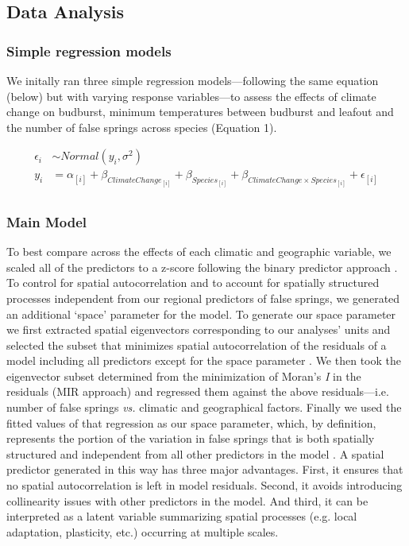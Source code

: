 \documentclass{article}\usepackage[]{graphicx}\usepackage[]{color}
\begin{document}
\subsection*{Data Analysis} 
\subsubsection*{Simple regression models}
We initally ran three simple regression models---following the same equation (below) but with varying response variables---to assess the effects of climate change on budburst, minimum temperatures between budburst and leafout and the number of false springs across species (Equation 1).

\begin{align*}
\epsilon_i & \sim Normal(y_i ,  \sigma^{2}) \tag{1}\\
y_i &= \alpha_{[i]} + \beta_{ClimateChange_{[i]}} + \beta_{Species_{[i]}} + \beta_{ClimateChange \times Species_{[i]}} + \epsilon_{[i]} \nonumber\\
\end{align*}

\subsubsection*{Main Model}
To best compare across the effects of each climatic and geographic variable, we scaled all of the predictors to a z-score following the binary predictor approach \citep{Gelman2006}. To control for spatial autocorrelation and to account for spatially structured processes independent from our regional predictors of false springs, we generated an additional `space' parameter for the model. To generate our space parameter we first extracted spatial eigenvectors corresponding to our analyses' units and selected the subset that minimizes spatial autocorrelation of the residuals of a model including all predictors except for the space parameter \citep[][ see supplemental materials `Supporting Information Methods S2: Spatial parameter' for more details]{diniz2012selection,Baumen2017}. We then took the eigenvector subset determined from the minimization of Moran's \textit{I} in the residuals (MIR approach) and regressed them against the above residuals---i.e. number of false springs \emph{vs.} climatic and geographical factors. Finally we used the fitted values of that regression as our space parameter, which, by definition, represents the portion of the variation in false springs that is both spatially structured and independent from all other predictors in the model \citep[e.g. average spring temperature, elevation, etc.][]{griffith2006spatial,morales2012imprint}. A spatial predictor generated in this way has three major advantages. First, it ensures that no spatial autocorrelation is left in model residuals. Second, it avoids introducing collinearity issues with other predictors in the model. And third, it can be interpreted as a latent variable summarizing spatial processes (e.g. local adaptation, plasticity, etc.) occurring at multiple scales.
\end{document}
